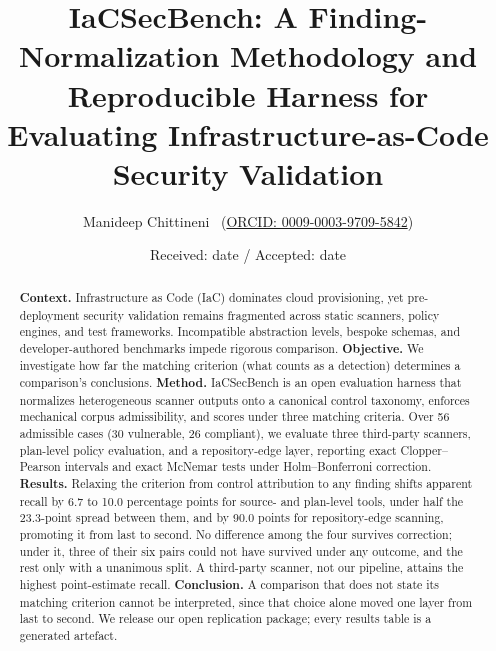 \documentclass[smallextended]{svjour3}
\newcommand{\institute}[1]{}
\newcommand{\titlerunning}[1]{}
\newcommand{\authorrunning}[1]{}
\providecommand{\orcidID}[1]{\unskip~(\href{https://orcid.org/#1}{\footnotesize ORCID: #1})}
\begin{document}
\title{IaCSecBench: A Finding-Normalization Methodology and Reproducible
Harness for Evaluating Infrastructure-as-Code Security Validation}
\titlerunning{IaCSecBench: Finding Normalization for IaC Security Validation}

\author{Manideep Chittineni \orcidID{0009-0003-9709-5842}}
\authorrunning{M. Chittineni}

\institute{M. Chittineni \at
  Independent Researcher, London, United Kingdom \\
  \email{manideep.chittineni@hotmail.com}}

\date{Received: date / Accepted: date}

\maketitle

\begin{abstract}
\textbf{Context.} Infrastructure as Code (IaC) dominates cloud provisioning, yet pre-deployment security validation remains fragmented across static scanners, policy engines, and test frameworks. Incompatible abstraction levels, bespoke schemas, and developer-authored benchmarks impede rigorous comparison.
\textbf{Objective.} We investigate how far the matching criterion (what counts as a detection) determines a comparison's conclusions.
\textbf{Method.} IaCSecBench is an open evaluation harness that normalizes heterogeneous scanner outputs onto a canonical control taxonomy, enforces mechanical corpus admissibility, and scores under three matching criteria. Over 56 admissible cases (30 vulnerable, 26 compliant), we evaluate three third-party scanners, plan-level policy evaluation, and a repository-edge layer, reporting exact Clopper--Pearson intervals and exact McNemar tests under Holm--Bonferroni correction.
\textbf{Results.} Relaxing the criterion from control attribution to any finding shifts apparent recall by 6.7 to 10.0 percentage points for source- and plan-level tools, under half the 23.3-point spread between them, and by 90.0 points for repository-edge scanning, promoting it from last to second. No difference among the four survives correction; under it, three of their six pairs could not have survived under any outcome, and the rest only with a unanimous split. A third-party scanner, not our pipeline, attains the highest point-estimate recall.
\textbf{Conclusion.} A comparison that does not state its matching criterion cannot be interpreted, since that choice alone moved one layer from last to second. We release our open replication package; every results table is a generated artefact.
\end{abstract}
\end{document}
